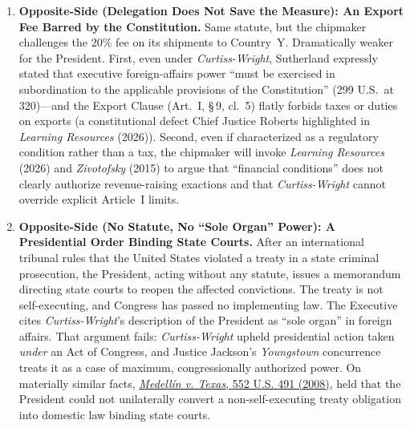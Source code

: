 \documentclass[12pt]{article}
\begin{document}
\begin{enumerate}
\item \textbf{Opposite-Side (Delegation Does Not Save the Measure): An Export Fee Barred by the Constitution.} Same statute, but the chipmaker challenges the 20\% fee on its shipments to Country~Y. Dramatically weaker for the President. First, even under \textit{Curtiss-Wright}, Sutherland expressly stated that executive foreign-affairs power ``must be exercised in subordination to the applicable provisions of the Constitution'' (299 U.S.\ at 320)---and the Export Clause (Art.\ I, \S\,9, cl.\ 5) flatly forbids taxes or duties on exports (a constitutional defect Chief Justice Roberts highlighted in \textit{Learning Resources} (2026)). Second, even if characterized as a regulatory condition rather than a tax, the chipmaker will invoke \textit{Learning Resources} (2026) and \textit{Zivotofsky} (2015) to argue that ``financial conditions'' does not clearly authorize revenue-raising exactions and that \textit{Curtiss-Wright} cannot override explicit Article~I limits.

\item \textbf{Opposite-Side (No Statute, No ``Sole Organ'' Power): A Presidential Order Binding State Courts.} After an international tribunal rules that the United States violated a treaty in a state criminal prosecution, the President, acting without any statute, issues a memorandum directing state courts to reopen the affected convictions. The treaty is not self-executing, and Congress has passed no implementing law. The Executive cites \textit{Curtiss-Wright}'s description of the President as ``sole organ'' in foreign affairs. That argument fails: \textit{Curtiss-Wright} upheld presidential action taken \emph{under} an Act of Congress, and Justice Jackson's \textit{Youngstown} concurrence treats it as a case of maximum, congressionally authorized power. On materially similar facts, \href{https://supreme.justia.com/cases/federal/us/552/491/}{\textit{Medell\'in v. Texas}, 552 U.S. 491 (2008)}, held that the President could not unilaterally convert a non-self-executing treaty obligation into domestic law binding state courts.


\end{enumerate}
\end{document}
